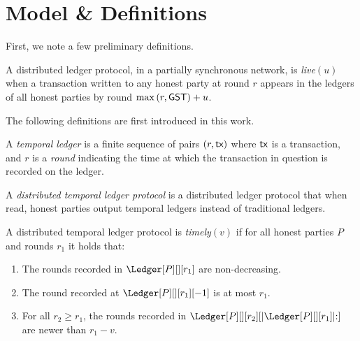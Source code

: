 \section{Model \& Definitions}


First, we note a few preliminary definitions.

\begin{definition}
  A distributed ledger protocol, in a partially synchronous network,
  is \emph{live}$(u)$ when a transaction written to any honest party
  at round $r$ appears in the ledgers of all honest parties by round %
  $\max{(r,\textsf{GST})} + u$.
\end{definition}


The following definitions are first introduced in this work.

\begin{definition}
  A \emph{temporal ledger} is a finite sequence of pairs $(r, \textsf{tx})$ where $\textsf{tx}$ is
  a transaction, and $r$ is a \emph{round} indicating the time at which
  the transaction in question is recorded on the ledger.
\end{definition}

\begin{definition}
  A \emph{distributed temporal ledger protocol} is a distributed ledger protocol
  that when read, honest parties output temporal ledgers instead of traditional ledgers.
\end{definition}

\begin{definition}[Timely]\label{def:timely}
  A distributed temporal ledger protocol is \emph{timely}$(v)$
  if for all honest parties $P$ and rounds $r_1$ it holds that:

  \begin{enumerate}
    \item The rounds recorded in $\Ledger[P][][r_1]$ are non-decreasing.\label{def:timely-increasing}
    \item The round recorded at $\Ledger[P][][r_1][-1]$ is at most $r_1$.\label{def:timely-past}
    \item For all $r_2 \geq r_1$, the rounds recorded in $\Ledger[P][][r_2][|\Ledger[P][][r_1]|{:}]$ are
          newer than $r_1 - v$.\label{def:timely-chunk}
  \end{enumerate}
\end{definition}
